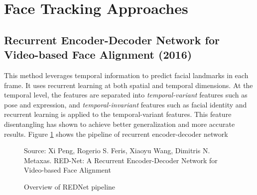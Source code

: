 \documentclass{llncs}
\begin{document}
\section{Face Tracking Approaches}

\subsection{Recurrent Encoder-Decoder Network for Video-based Face Alignment (2016) \cite{rednet}}

This method leverages temporal information to predict facial landmarks in each frame. It uses recurrent learning at both spatial and temporal dimensions. At the temporal level, the features are separated into \textit{temporal-variant} features such as pose and expression, and \textit{temporal-invariant} features such as facial identity and recurrent learning is applied to the temporal-variant features. This feature disentangling has shown to achieve better generalization and more accurate results. Figure \ref{rednet_architecture} shows the pipeline of recurrent encoder-decoder network \\

\begin{figure}
%
{Source: Xi Peng, Rogerio S. Feris, Xiaoyu Wang, Dimitris N. Metaxas. RED-Net: A Recurrent Encoder-Decoder Network for Video-based Face Alignment}
\caption{Overview of REDNet pipeline}
\label{rednet_architecture}
\end{figure}
\end{document}
